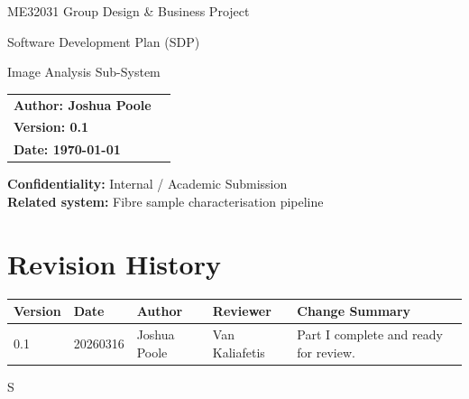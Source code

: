 \documentclass[11pt,a4paper]{article}
\newcommand{\docTitle}{Software Development Plan (SDP)}
\newcommand{\subsystemName}{Image Analysis Sub-System}
\newcommand{\projectName}{ME32031 Group Design \& Business Project}
\begin{document}
\begin{titlepage}
  \centering
  \vspace*{2cm}

  {\Large \projectName \par}
  \vspace{1.5cm}

  {\Huge \docTitle \par}
  \vspace{0.5cm}
  {\LARGE \subsystemName \par}

  \vspace{2cm}

  \begin{tabular}{@{}ll@{}}
    \textbf{Author: Joshua Poole}\\
    \textbf{Version: 0.1}\\
    \textbf{Date: \today}\\
  \end{tabular}

  \vfill
  \begin{flushleft}
  \textbf{Confidentiality:} Internal / Academic Submission \\
  \textbf{Related system:} Fibre sample characterisation pipeline \\
  \end{flushleft}

\end{titlepage}

\tableofcontents
\newpage


\section{Revision History}
\begin{table}[H]
  \centering
  \renewcommand{\arraystretch}{1.2}
  \begin{tabular}{@{}llllp{6.5cm}@{}}
    \toprule
    \textbf{Version} & \textbf{Date} & \textbf{Author} & \textbf{Reviewer} & \textbf{Change Summary} \\
    \midrule
    0.1 & 20260316 & Joshua Poole & Van Kaliafetis & Part I complete and ready for review. \\
    \bottomrule
  \end{tabular}
\end{table}S

\end{document}

